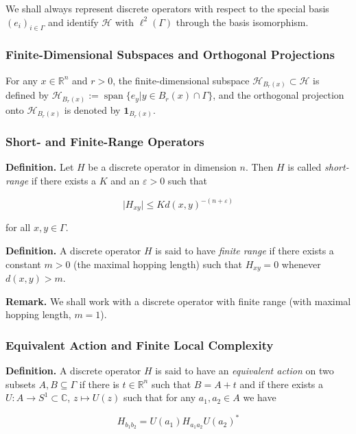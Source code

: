 \documentclass[11pt]{article}
\DeclareMathOperator{\spn}{span}
\begin{document}
We shall always represent discrete operators with respect to the special basis $(e_i)_{i \in \Gamma}$ and identify $\mathcal{H}$ with $\ell^2 (\Gamma)$ through the basis isomorphism.

\subsubsection{Finite-Dimensional Subspaces and Orthogonal Projections}

For any $x \in \mathbb{R}^n$ and $r > 0$, the finite-dimensional subspace $\mathcal{H}_{B_r(x)} \subset \mathcal{H}$ is defined by $\mathcal{H}_{B_r(x)} := \spn \{ e_y \vert y \in B_r(x) \cap \Gamma \}$, and the orthogonal projection onto $\mathcal{H}_{B_r(x)}$ is denoted by $\mathbf{1}_{B_r(x)}$.

\subsubsection{Short- and Finite-Range Operators}

\textbf{Definition.} Let $H$ be a discrete operator in dimension $n$. Then $H$ is called \textit{short-range} if there exists a $K$ and an $\varepsilon > 0$ such that

\begin{equation}
    \vert H_{xy} \vert \leq K d(x, y)^{-(n + \varepsilon)}
\end{equation}

for all $x, y \in \Gamma$.

\textbf{Definition.} A discrete operator $H$ is said to have \textit{finite range} if there exists a constant $m > 0$ (the maximal hopping length) such that $H_{xy} = 0$ whenever $d(x, y) > m$.

\textbf{Remark.} We shall work with a discrete operator with finite range (with maximal hopping length, $m = 1$).

\subsubsection{Equivalent Action and Finite Local Complexity}

\textbf{Definition.} A discrete operator $H$ is said to have an \textit{equivalent action} on two subsets $A, B \subseteq \Gamma$ if there is $t \in \mathbb{R}^n$ such that $B = A + t$ and if there exists a $U: A \rightarrow S^1 \subset \mathbb{C}$, $z \mapsto U(z)$ such that for any $a_1, a_2 \in A$ we have

\begin{equation}
    H_{b_1 b_2} = U(a_1) H_{a_1 a_2} U(a_2)^*
\end{equation}
\end{document}
